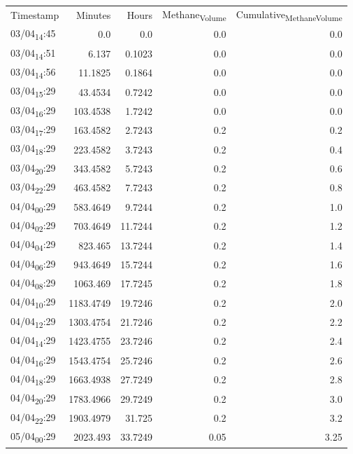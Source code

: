 \documentclass[11pt]{article}
\begin{document}
\begin{center}
\begin{tabular}{lrrrr}
Timestamp & Minutes & Hours & Methane\textsubscript{Volume} & Cumulative\textsubscript{Methane}\textsubscript{Volume}\\[0pt]
03/04\textsubscript{14}:45 & 0.0 & 0.0 & 0.0 & 0.0\\[0pt]
03/04\textsubscript{14}:51 & 6.137 & 0.1023 & 0.0 & 0.0\\[0pt]
03/04\textsubscript{14}:56 & 11.1825 & 0.1864 & 0.0 & 0.0\\[0pt]
03/04\textsubscript{15}:29 & 43.4534 & 0.7242 & 0.0 & 0.0\\[0pt]
03/04\textsubscript{16}:29 & 103.4538 & 1.7242 & 0.0 & 0.0\\[0pt]
03/04\textsubscript{17}:29 & 163.4582 & 2.7243 & 0.2 & 0.2\\[0pt]
03/04\textsubscript{18}:29 & 223.4582 & 3.7243 & 0.2 & 0.4\\[0pt]
03/04\textsubscript{20}:29 & 343.4582 & 5.7243 & 0.2 & 0.6\\[0pt]
03/04\textsubscript{22}:29 & 463.4582 & 7.7243 & 0.2 & 0.8\\[0pt]
04/04\textsubscript{00}:29 & 583.4649 & 9.7244 & 0.2 & 1.0\\[0pt]
04/04\textsubscript{02}:29 & 703.4649 & 11.7244 & 0.2 & 1.2\\[0pt]
04/04\textsubscript{04}:29 & 823.465 & 13.7244 & 0.2 & 1.4\\[0pt]
04/04\textsubscript{06}:29 & 943.4649 & 15.7244 & 0.2 & 1.6\\[0pt]
04/04\textsubscript{08}:29 & 1063.469 & 17.7245 & 0.2 & 1.8\\[0pt]
04/04\textsubscript{10}:29 & 1183.4749 & 19.7246 & 0.2 & 2.0\\[0pt]
04/04\textsubscript{12}:29 & 1303.4754 & 21.7246 & 0.2 & 2.2\\[0pt]
04/04\textsubscript{14}:29 & 1423.4755 & 23.7246 & 0.2 & 2.4\\[0pt]
04/04\textsubscript{16}:29 & 1543.4754 & 25.7246 & 0.2 & 2.6\\[0pt]
04/04\textsubscript{18}:29 & 1663.4938 & 27.7249 & 0.2 & 2.8\\[0pt]
04/04\textsubscript{20}:29 & 1783.4966 & 29.7249 & 0.2 & 3.0\\[0pt]
04/04\textsubscript{22}:29 & 1903.4979 & 31.725 & 0.2 & 3.2\\[0pt]
05/04\textsubscript{00}:29 & 2023.493 & 33.7249 & 0.05 & 3.25\\[0pt]

\end{tabular}
\end{center}
\end{document}
